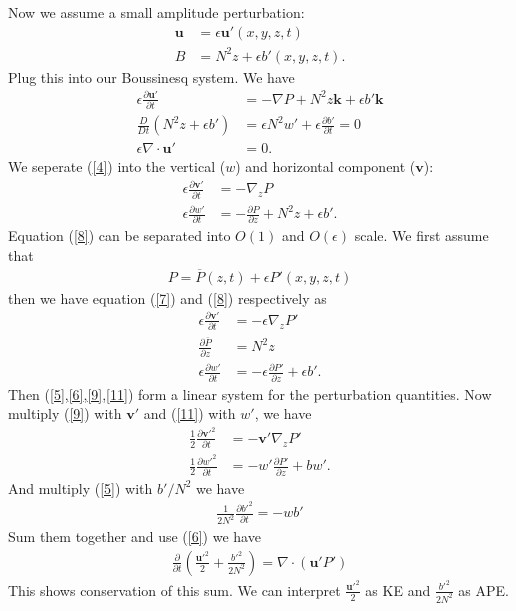 \documentclass[11pt,letterpaper]{book}
\theoremstyle{definition}
\newcommand{\pe}{\partial}
\newcommand{\dsp}{\displaystyle}
\newcommand{\ve}[1]{\boldsymbol{#1}}
\begin{document}
\subsection{}\label{p1_b}
Now we assume a small amplitude perturbation:
\begin{align*}
\ve u &= \epsilon\ve u'(x,y,z,t)\\
B &= N^2z+\epsilon b'(x,y,z,t).
\end{align*}
Plug this into our Boussinesq system. We have
\begin{align}
\epsilon\frac{\pe \ve u'}{\pe t} &= -\nabla P+N^2z\ve k+\epsilon b'\ve k\label{4}\\
\frac{D}{Dt}(N^2z+\epsilon b') &= \epsilon N^2 w'+\epsilon\frac{\pe b'}{\pe t} = 0\label{5}\\
\epsilon\nabla\cdot\ve u' &= 0\label{6}.
\end{align}
We seperate (\ref{4}) into the vertical ($w$) and horizontal component ($\ve v$):
\begin{align}
\epsilon\frac{\pe \ve v'}{\pe t} &= -\nabla_z P\label{7}\\
\epsilon\frac{\pe w'}{\pe t} &= -\frac{\pe P}{\pe z}+N^2 z+\epsilon b'\label{8}.
\end{align}
Equation (\ref{8}) can be separated into $O(1)$ and $O(\epsilon)$ scale. We first assume that
\begin{align*}
P = \overline{P}(z,t)+\epsilon P'(x,y,z,t)
\end{align*}
then we have equation (\ref{7}) and (\ref{8}) respectively as 
\begin{align}
\epsilon\frac{\pe \ve v'}{\pe t} &= -\epsilon \nabla_z P'\label{9}\\
\frac{\pe \overline{P}}{\pe z} &= N^2 z\label{10}\\
\epsilon\frac{\pe w'}{\pe t} &= -\epsilon\frac{\pe P'}{\pe z}+\epsilon b'\label{11}.
\end{align}
Then (\ref{5},\ref{6},\ref{9},\ref{11}) form a linear system for the perturbation quantities. Now multiply (\ref{9}) with $\ve v'$ and (\ref{11}) with $w'$, we have
\begin{align*}
\frac{1}{2}\frac{\pe \ve v'^2}{\pe t} &= -\ve v'\nabla_z P'\\
\frac{1}{2}\frac{\pe w'^2}{\pe t} &= -w'\frac{\pe P'}{\pe z}+ bw'.
\end{align*}
And multiply (\ref{5}) with $b'/N^2$ we have 
\begin{align*}
\frac{1}{2N^2}\frac{\pe b'^2}{\pe t} = -  wb'
\end{align*}
Sum them together and use (\ref{6}) we have
\begin{align*}
\frac{\pe}{\pe t}\left(\frac{\ve u'^2}{2}+\frac{b'^2}{2N^2}\right) = \nabla\cdot(\ve u' P')
\end{align*}
This shows conservation of this sum. We can interpret $\dsp{\frac{\ve u'^2}{2}}$ as KE and $\dsp{\frac{b'^2}{2N^2}}$ as APE.
\end{document}
